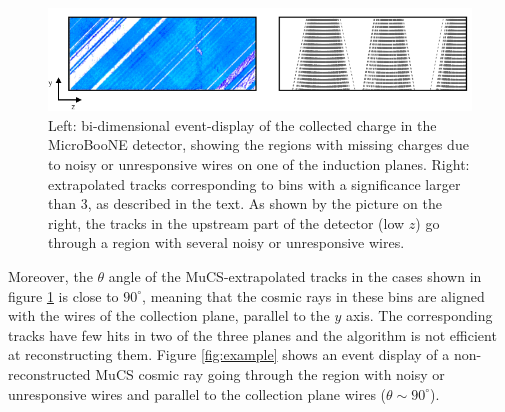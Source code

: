 \documentclass[a4paper,11pt]{article}
\begin{document}
\begin{figure}[htbp]
  \begin{center}
    \includegraphics[width=1\linewidth]{figures/wire_tracks.png}
    \caption{Left: bi-dimensional event-display of the collected charge in the MicroBooNE detector, showing the regions with missing charges due to noisy or unresponsive wires on one of the induction planes. Right: extrapolated tracks corresponding to bins with a significance larger than 3, as described in the text. As shown by the picture on the right, the tracks in the upstream part of the detector (low $z$) go through a region with several noisy or unresponsive wires.} \label{fig:wires}
  \end{center}
\end{figure}


Moreover, the $\theta$ angle of the MuCS-extrapolated tracks in the cases shown in figure \ref{fig:wires} is close to $90^\circ$, meaning that the cosmic rays in these bins are aligned with the wires of the collection plane, parallel to the $y$ axis. The corresponding tracks have few hits in two of the three planes and the algorithm is not efficient at reconstructing them. Figure \ref{fig:example} shows an event display of a non-reconstructed MuCS cosmic ray going through the region with noisy or unresponsive wires and parallel to the collection plane wires ($\theta \sim 90^\circ$).
\end{document}
